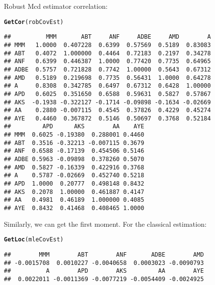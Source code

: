 \documentclass[12pt,letterpaper,english]{article}\usepackage[]{graphicx}\usepackage[]{color}
\makeatletter
\newcommand{\hlstd}[1]{\textcolor[rgb]{0.345,0.345,0.345}{#1}}%
\newcommand{\hlkwd}[1]{\textcolor[rgb]{0.737,0.353,0.396}{\textbf{#1}}}%
\newenvironment{kframe}{%
 \def\at@end@of@kframe{}%
 \ifinner\ifhmode%
  \def\at@end@of@kframe{\end{minipage}}%
  \begin{minipage}{\columnwidth}%
 \fi\fi%
 \def\FrameCommand##1{\hskip\@totalleftmargin \hskip-\fboxsep
 \colorbox{shadecolor}{##1}\hskip-\fboxsep
     \hskip-\linewidth \hskip-\@totalleftmargin \hskip\columnwidth}%
 \MakeFramed {\advance\hsize-\width
   \@totalleftmargin\z@ \linewidth\hsize
   \@setminipage}}%
 {\par\unskip\endMakeFramed%
 \at@end@of@kframe}
\newenvironment{knitrout}{}{} %
\makeatother
\begin{document}
Robust Mcd estimator correlation:
\begin{knitrout}
\color{fgcolor}\begin{kframe}
\begin{alltt}
\hlkwd{GetCor}\hlstd{(robCovEst)}
\end{alltt}
\begin{verbatim}
##          MMM       ABT     ANF     ADBE     AMD        A
## MMM   1.0000  0.407228  0.6399  0.57569  0.5189  0.83083
## ABT   0.4072  1.000000  0.4464  0.72183  0.2197  0.34278
## ANF   0.6399  0.446387  1.0000  0.77420  0.7735  0.64965
## ADBE  0.5757  0.721828  0.7742  1.00000  0.5643  0.67312
## AMD   0.5189  0.219698  0.7735  0.56431  1.0000  0.64278
## A     0.8308  0.342785  0.6497  0.67312  0.6428  1.00000
## APD   0.6025  0.351650  0.6588  0.59631  0.5827  0.57867
## AKS  -0.1938 -0.322127 -0.1714 -0.09898 -0.1634 -0.02669
## AA    0.2880 -0.007115  0.4545  0.37826  0.4229  0.45274
## AYE   0.4460  0.367872  0.5146  0.50697  0.3768  0.52184
##         APD      AKS        AA    AYE
## MMM  0.6025 -0.19380  0.288001 0.4460
## ABT  0.3516 -0.32213 -0.007115 0.3679
## ANF  0.6588 -0.17139  0.454506 0.5146
## ADBE 0.5963 -0.09898  0.378260 0.5070
## AMD  0.5827 -0.16339  0.422916 0.3768
## A    0.5787 -0.02669  0.452740 0.5218
## APD  1.0000  0.20777  0.498148 0.8432
## AKS  0.2078  1.00000  0.461887 0.4147
## AA   0.4981  0.46189  1.000000 0.4085
## AYE  0.8432  0.41468  0.408465 1.0000
\end{verbatim}
\end{kframe}
\end{knitrout}

Similarly, we can get the first moment.
For the classical estimation:
\begin{knitrout}
\color{fgcolor}\begin{kframe}
\begin{alltt}
\hlkwd{GetLoc}\hlstd{(mleCovEst)}
\end{alltt}
\begin{verbatim}
##        MMM        ABT        ANF       ADBE        AMD 
## -0.0015708  0.0010227 -0.0040658  0.0003023 -0.0090793 
##          A        APD        AKS         AA        AYE 
##  0.0022011 -0.0011369 -0.0077219 -0.0054409 -0.0024925
\end{verbatim}
\end{kframe}
\end{knitrout}
\end{document}
